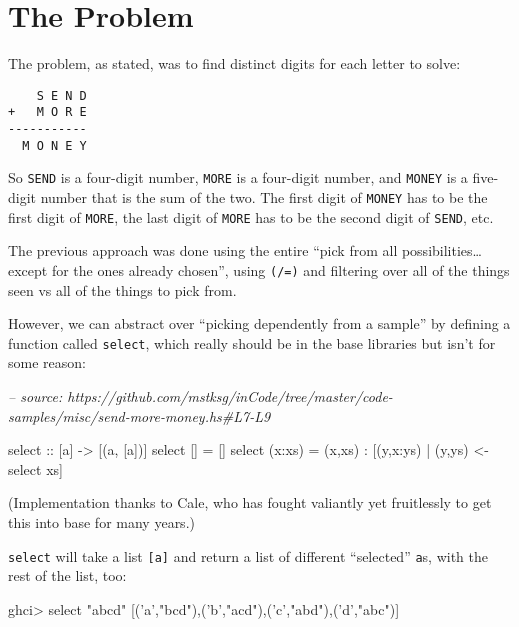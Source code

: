 \documentclass[]{article}
\newenvironment{Shaded}{}{}
\newcommand{\CharTok}[1]{\textcolor[rgb]{0.25,0.44,0.63}{#1}}
\newcommand{\CommentTok}[1]{\textcolor[rgb]{0.38,0.63,0.69}{\textit{#1}}}
\newcommand{\FunctionTok}[1]{\textcolor[rgb]{0.02,0.16,0.49}{#1}}
\newcommand{\NormalTok}[1]{#1}
\newcommand{\OtherTok}[1]{\textcolor[rgb]{0.00,0.44,0.13}{#1}}
\newcommand{\StringTok}[1]{\textcolor[rgb]{0.25,0.44,0.63}{#1}}
\begin{document}
\hypertarget{the-problem}{%
\section{The Problem}\label{the-problem}}

The problem, as stated, was to find distinct digits for each letter to solve:

\begin{verbatim}
    S E N D
+   M O R E
-----------
  M O N E Y
\end{verbatim}

So \texttt{SEND} is a four-digit number, \texttt{MORE} is a four-digit number,
and \texttt{MONEY} is a five-digit number that is the sum of the two. The first
digit of \texttt{MONEY} has to be the first digit of \texttt{MORE}, the last
digit of \texttt{MORE} has to be the second digit of \texttt{SEND}, etc.

The previous approach was done using the entire ``pick from all
possibilities\ldots{}except for the ones already chosen'', using \texttt{(/=)}
and filtering over all of the things seen vs all of the things to pick from.

However, we can abstract over ``picking dependently from a sample'' by defining
a function called \texttt{select}, which really should be in the base libraries
but isn't for some reason:

\begin{Shaded}
\begin{Highlighting}[]
\CommentTok{-- source: https://github.com/mstksg/inCode/tree/master/code-samples/misc/send-more-money.hs#L7-L9}

\OtherTok{select ::}\NormalTok{ [a] }\OtherTok{->}\NormalTok{ [(a, [a])]}
\NormalTok{select []     }\FunctionTok{=}\NormalTok{ []}
\NormalTok{select (x}\FunctionTok{:}\NormalTok{xs) }\FunctionTok{=}\NormalTok{ (x,xs) }\FunctionTok{:}\NormalTok{ [(y,x}\FunctionTok{:}\NormalTok{ys) }\FunctionTok{|}\NormalTok{ (y,ys) }\OtherTok{<-}\NormalTok{ select xs]}
\end{Highlighting}
\end{Shaded}

(Implementation thanks to Cale, who has fought valiantly yet fruitlessly to get
this into base for many years.)

\texttt{select} will take a list \texttt{{[}a{]}} and return a list of different
``selected'' \texttt{a}s, with the rest of the list, too:

\begin{Shaded}
\begin{Highlighting}[]
\NormalTok{ghci}\FunctionTok{>}\NormalTok{ select }\StringTok{"abcd"}
\NormalTok{[(}\CharTok{'a'}\NormalTok{,}\StringTok{"bcd"}\NormalTok{),(}\CharTok{'b'}\NormalTok{,}\StringTok{"acd"}\NormalTok{),(}\CharTok{'c'}\NormalTok{,}\StringTok{"abd"}\NormalTok{),(}\CharTok{'d'}\NormalTok{,}\StringTok{"abc"}\NormalTok{)]}
\end{Highlighting}
\end{Shaded}
\end{document}
